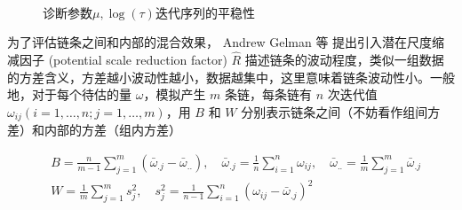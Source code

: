\documentclass[12pt,a4paper,UTF8,twoside]{book}
\theoremstyle{definition}
\theoremstyle{definition}
\theoremstyle{definition}
\theoremstyle{remark}
\begin{document}
\begin{figure}[!htb]

{\centering {}\\

}

\caption{诊断参数$\mu,\log(\tau)$迭代序列的平稳性}\label{fig:diagnostic}
\end{figure}

为了评估链条之间和内部的混合效果， Andrew Gelman 等 \citep{Gelman2013R}
提出引入潜在尺度缩减因子 (potential scale reduction factor) \(\hat{R}\)
描述链条的波动程度，类似一组数据的方差含义，方差越小波动性越小，数据越集中，这里意味着链条波动性小。一般地，对于每个待估的量
\(\omega\)，模拟产生 \(m\) 条链，每条链有 \(n\) 次迭代值
\(\omega_{ij} (i = 1,\ldots,n;j=1,\ldots,m)\)，用 \(B\) 和 \(W\)
分别表示链条之间（不妨看作组间方差）和内部的方差（组内方差）

\begin{equation}
\begin{aligned}
& B = \frac{n}{m-1}\sum_{j=1}^{m}(\bar{\omega}_{.j} - \bar{\omega}_{..} ), \quad \bar{\omega}_{.j} = \frac{1}{n}\sum_{i=1}^{n}\omega_{ij}, \quad \bar{\omega}_{..} = \frac{1}{m}\sum_{j=1}^{m} \bar{\omega}_{.j}\\
& W = \frac{1}{m}\sum_{j=1}^{m}s^{2}_{j}, \quad s^{2}_{j} = \frac{1}{n-1}\sum_{i=1}^{n}(\omega_{ij} - \bar{\omega}_{.j})^2
\end{aligned} \label{eq:potential-scale-reduction}
\end{equation}
\end{document}
